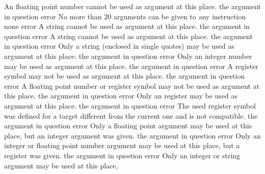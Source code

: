 \documentclass[12pt,twoside]{report}
\begin{document}
\begin{description}
               {An floating point number cannot be used as argument at this place.}
               {the argument in question}
               {error}
               {No more than 20 arguments can be given to any instruction}
               {none}
               {error}
               {A string cannot be used as argument at this place.}
               {the argument in question}
               {error}
               {A string cannot be used as argument at this place.}
               {the argument in question}
               {error}
               {Only a string (enclosed in single quotes) may be used as
                argument at this place.}
               {the argument in question}
               {error}
               {Only an integer number may be used as argument at this place.}
               {the argument in question}
               {error}
               {A register symbol may not be used as argument at this place.}
               {the argument in question}
               {error}
               {A floating point number or register symbol may not be used as argument at this place.}
               {the argument in question}
               {error}
               {Only an register may be used as argument at this place.}
               {the argument in question}
               {error}
               {The used register symbol was defined for a target different from
                the current one and is not compatible.}
               {the argument in question}
               {error}
               {Only a floating point argument may be used at this place,
                but an integer argument was given.}
               {the argument in question}
               {error}
               {Only an integer or floating point number argument may be used at this place,
                but a register was given.}
               {the argument in question}
               {error}
               {Only an integer or string argument may be used at this place,
}
\end{description}
\end{document}
